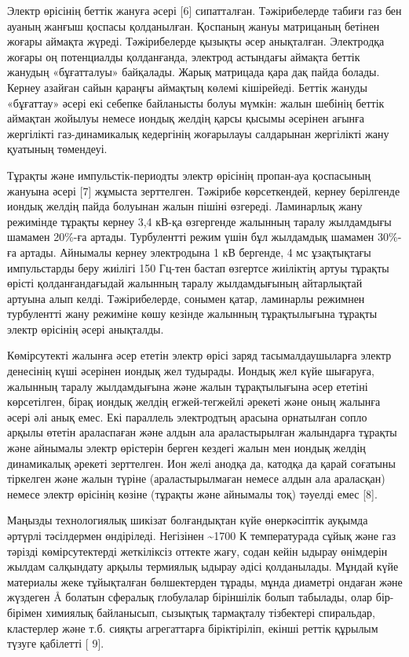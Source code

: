 \begin{multicols}{2}
Электр өрісінің беттік жануға әсері {[}6{]} сипатталған. Тәжірибелерде
табиғи газ бен ауаның жанғыш қоспасы қолданылған. Қоспаның жануы
матрицаның бетінен жоғары аймақта жүреді. Тәжірибелерде қызықты әсер
анықталған. Электродқа жоғары оң потенциалды қолданғанда, электрод
астындағы аймақта беттік жанудың «бұғатталуы» байқалады. Жарық матрицада
қара дақ пайда болады. Кернеу азайған сайын қараңғы аймақтың көлемі
кішірейеді. Беттік жануды «бұғаттау» әсері екі себепке байланысты болуы
мүмкін: жалын шебінің беттік аймақтан жойылуы немесе иондық желдің қарсы
қысымы әсерінен ағынға жергілікті газ-динамикалық кедергінің жоғарылауы
салдарынан жергілікті жану қуатының төмендеуі.

Тұрақты және импульстік-периодты электр өрісінің пропан-ауа қоспасының
жануына әсері {[}7{]} жұмыста зерттелген. Тәжірибе көрсеткендей, кернеу
берілгенде иондық желдің пайда болуынан жалын пішіні өзгереді.
Ламинарлық жану режимінде тұрақты кернеу 3,4 кВ-қа өзгергенде жалынның
таралу жылдамдығы шамамен 20\%-ға артады. Турбулентті режим үшін бұл
жылдамдық шамамен 30\%-ға артады. Айнымалы кернеу электродына 1 кВ
бергенде, 4 мс ұзақтықтағы импульстарды беру жиілігі 150 Гц-тен бастап
өзгертсе жиіліктің артуы тұрақты өрісті қолданғандағыдай жалынның таралу
жылдамдығының айтарлықтай артуына алып келді. Тәжірибелерде, сонымен
қатар, ламинарлы режимнен турбулентті жану режиміне көшу кезінде
жалынның тұрақтылығына тұрақты электр өрісінің әсері анықталды.

Көмірсутекті жалынға әсер ететін электр өрісі заряд тасымалдаушыларға
электр денесінің күші әсерінен иондық жел тудырады. Иондық жел күйе
шығаруға, жалынның таралу жылдамдығына және жалын тұрақтылығына әсер
ететіні көрсетілген, бірақ иондық желдің егжей-тегжейлі әрекеті және
оның жалынға әсері әлі анық емес. Екі параллель электродтың арасына
орнатылған сопло арқылы өтетін араласпаған және алдын ала араластырылған
жалындарға тұрақты және айнымалы электр өрістерін берген кездегі жалын
мен иондық желдің динамикалық әрекеті зерттелген. Ион желі анодқа да,
катодқа да қарай соғатыны тіркелген және жалын түріне (араластырылмаған
немесе алдын ала араласқан) немесе электр өрісінің көзіне (тұрақты және
айнымалы тоқ) тәуелді емес {[}8{]}.

Маңызды технологиялық шикізат болғандықтан күйе өнеркәсіптік ауқымда
әртүрлі тәсілдермен өндіріледі. Негізінен \textasciitilde1700 К
температурада сұйық және газ тәрізді көмірсутектерді жеткіліксіз оттекте
жағу, содан кейін ыдырау өнімдерін жылдам салқындату арқылы термиялық
ыдырау әдісі қолданылады. Мұндай күйе материалы жеке тұйықталған
бөлшектерден тұрады, мұнда диаметрі ондаған және жүздеген Å болатын
сфералық глобулалар біріншілік болып табылады, олар бір-бірімен химиялық
байланысып, сызықтық тармақталу тізбектері спиральдар, кластерлер және
т.б. сияқты агрегаттарға біріктіріліп, екінші реттік құрылым түзуге
қабілетті {[} 9{]}.


\end{multicols}
